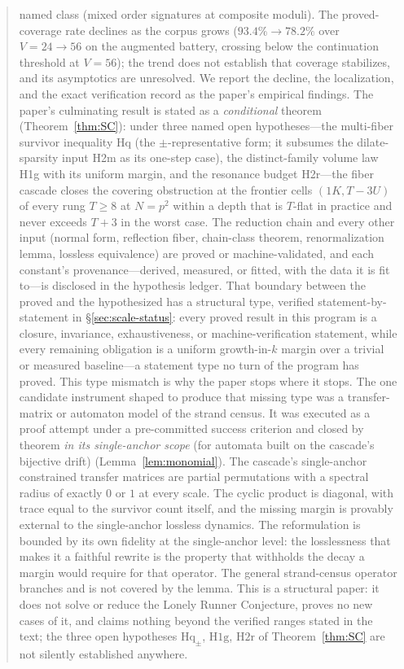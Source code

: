 \documentclass[11pt,a4paper]{article}
\numberwithin{equation}{section}
\theoremstyle{plain}
\theoremstyle{definition}
\theoremstyle{remark}
\begin{document}
\begin{abstract}
named class (mixed order signatures at composite moduli). The proved-coverage
rate declines as the corpus grows ($93.4\%\to78.2\%$ over $V=24\to56$ on the
augmented battery, crossing below the continuation threshold at $V=56$);
the trend does not establish that coverage stabilizes, and its asymptotics
are unresolved. We report the decline, the localization, and the exact
verification record as the paper's empirical findings.
The paper's culminating result is stated as a \emph{conditional}
theorem (Theorem~\ref{thm:SC}): under three named open hypotheses---the
multi-fiber survivor inequality Hq (the $\pm$-representative form; it
subsumes the dilate-sparsity input H2m as its one-step case),
the distinct-family volume law H1g with its uniform margin, and the
resonance budget H2r---the fiber cascade closes the covering
obstruction at the frontier cells $(1K,T{-}3U)$ of every rung $T\ge 8$
at $N=p^2$ within a depth that is $T$-flat in practice and never
exceeds $T+3$ in the worst case. The reduction chain and every other
input (normal form, reflection fiber, chain-class theorem,
renormalization lemma, lossless equivalence) are proved or
machine-validated, and each constant's provenance---derived, measured,
or fitted, with the data it is fit to---is disclosed in the hypothesis
ledger.
That boundary between the proved and the hypothesized has a structural
type, verified statement-by-statement in \S\ref{sec:scale-status}: every
proved result in this program is a closure, invariance, exhaustiveness,
or machine-verification statement, while every remaining obligation is a
uniform growth-in-$k$ margin over a trivial or measured baseline---a
statement type no turn of the program has proved. This type mismatch is
why the paper stops where it stops. The one candidate instrument
shaped to produce that missing type was a transfer-matrix or automaton
model of the strand census. It was executed as a proof attempt under a
pre-committed success criterion and closed by theorem \emph{in its
single-anchor scope} (for automata built on the cascade's bijective
drift) (Lemma~\ref{lem:monomial}). The cascade's single-anchor
constrained transfer matrices are partial permutations with a spectral
radius of exactly $0$ or $1$ at every scale. The cyclic product is
diagonal, with trace equal to the survivor count itself, and the missing
margin is provably external to the single-anchor lossless dynamics. The
reformulation is bounded by its own fidelity at the single-anchor level:
the losslessness that makes it a faithful rewrite is the property that
withholds the decay a margin would require for that operator. The
general strand-census operator branches and is not covered by the lemma.
This is a structural paper: it does not solve or reduce the Lonely
Runner Conjecture, proves no new cases of it, and claims nothing beyond
the verified ranges stated in the text; the three open hypotheses
$\mathrm{Hq}_\pm$, $\mathrm{H1g}$, $\mathrm{H2r}$ of
Theorem~\ref{thm:SC} are not silently established anywhere.
\end{abstract}
\end{document}
